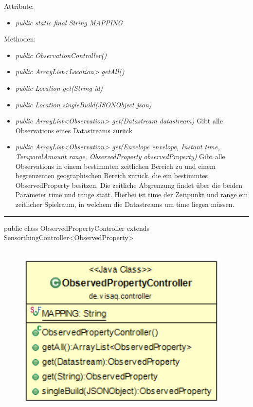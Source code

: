 Attribute:
\begin{itemize}
    \item \emph{public static final String MAPPING} \mappingDescription
\end{itemize}
Methoden:
\begin{itemize}
    \item \emph{public ObservationController()}
    \item \emph{public ArrayList<Location> getAll()}
    \extendsSensorthingController
    \item \emph{public Location get(String id)}
    \extendsSensorthingController
    \item \emph{public Location singleBuild(JSONObject json)}
    \extendsSensorthingController
    \item \emph{public ArrayList<Observation> get(Datastream datastream)}
    Gibt alle Observations eines Datastreams zurück
    \item \emph{public ArrayList<Observation> get(Envelope envelope, Instant time, TemporalAmount range, ObservedProperty observedProperty)}
    Gibt alle Observations in einem bestimmten zeitlichen Bereich zu und einem begrenzenten geographischen Bereich zurück, die ein bestimmtes ObservedProperty besitzen.
    Die zeitliche Abgrenzung findet über die beiden Parameter time und range statt. Hierbei ist time der Zeitpunkt und range ein zeitlicher Spielraum, in welchem die Datastreams um time liegen müssen.
\end{itemize}

\rule{\textwidth}{0.4pt}
public class ObservedPropertyController extends SensorthingController<ObservedProperty>
\\\\
\begin{minipage}{0.35\textwidth}
    \begin{figure}[H]
        {\centering\includegraphics[width=0.95\textwidth]{media/backend/controller/classes/ObservedPropertyController.png}}
    \end{figure}
    \end{minipage} \hfill
\begin{minipage}{0.65\textwidth}
\end{minipage}

